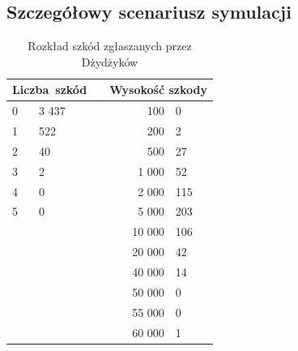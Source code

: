 \documentclass[12pt, a4paper, oneside]{mwart} %
\begin{document}
\subsection{Szczegółowy scenariusz symulacji}

\begin{table}
\centering
\caption{Rozkład szkód zgłaszanych przez Dżydżyków}
\label{r_szkod}
\begin{tabular}{p{1cm}|l||c||r|l}
\multicolumn{2}{c||}{Liczba~szkód}&\hspace{1cm}&\multicolumn{2}{c}{Wysokość szkody}\\ \hline
0&3 437& \hspace{1cm} & 100&0\\
1&522& \hspace{1cm} & 200&2\\
2&40& \hspace{1cm} & 500&27\\
3&2& \hspace{1cm} & 1 000&52\\
4&0& \hspace{1cm} & 2 000&115\\
5&0& \hspace{1cm} & 5 000&203\\
&&&10 000&106\\
&&&20 000&42\\
&&&40 000&14\\
&&&50 000&0\\
&&&55 000&0\\
&&&60 000&1\\
\end{tabular}
\end{table}
\end{document}
